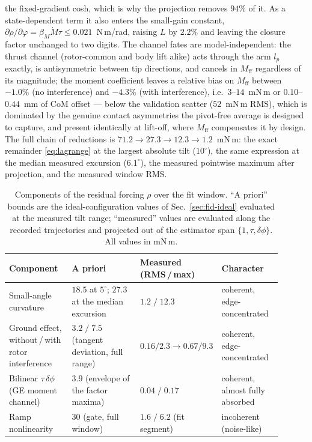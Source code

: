 the fixed-gradient cosh, which is why the projection removes $94\%$ of
it. As a state-dependent term it also enters the small-gain constant,
$\partial\rho/\partial\varphi = \beta_M\dot M\tau \le
0.021$~N\,m/rad, raising $L$ by $2.2\%$ and leaving the closure factor
unchanged to two digits. The channel fates are model-independent: the thrust channel
(rotor-common and body lift alike) acts through the arm $l_p$ exactly,
is antisymmetric between tip directions, and cancels in
$M_{\mathrm{ff}}$ regardless of its magnitude; the moment coefficient
leaves a relative bias on $M_{\mathrm{ff}}$ between $-1.0\%$
(no interference) and $-4.3\%$ (with interference), i.e.\
$3$--$14$~mN\,m or $0.10$--$0.44$~mm of CoM offset —
below the validation scatter ($52$~mN\,m RMS), which is dominated by
the genuine contact asymmetries the pivot-free average is designed to
capture, and present identically at lift-off, where $M_{\mathrm{ff}}$
compensates it by design. The full chain of reductions is
$71.2 \to 27.3 \to 12.3 \to 1.2$~mN\,m: the exact remainder
\eqref{eq:lagrange} at the largest absolute tilt ($10^\circ$), the same
expression at the median measured excursion ($6.1^\circ$), the measured
pointwise maximum after projection, and the measured window RMS.

\begin{table}[t]
\centering
\caption{Components of the residual forcing $\rho$ over the fit window.
``A priori'' bounds are the ideal-configuration values of
Sec.~\ref{sec:fid-ideal} evaluated at the measured tilt range;
``measured'' values are evaluated along the recorded trajectories and
projected out of the estimator span $\{1,\tau,\delta\phi\}$. All
values in mN\,m.}
\label{tab:rho}
\small
\setlength{\tabcolsep}{4pt}
\renewcommand{\arraystretch}{1.15}
\begin{tabular}{@{}p{0.235\linewidth} p{0.255\linewidth}
                  p{0.185\linewidth} p{0.225\linewidth}@{}}
\hline
\raggedright Component & \raggedright A priori &
\raggedright Measured (RMS\,/\,max) & \raggedright
Character \tabularnewline
\hline
\raggedright Small-angle curvature &
\raggedright $18.5$ at $5^\circ$; $27.3$ at the median
excursion & \raggedright $1.2\;/\;12.3$ &
\raggedright coherent, edge-concentrated \tabularnewline
\raggedright Ground effect, without\,/\,with rotor interference &
\raggedright $3.2\;/\;7.5$ (tangent deviation, full range) &
\raggedright $0.16/2.3 \rightarrow 0.67/9.3$ &
\raggedright coherent, edge-concentrated \tabularnewline
\raggedright Bilinear $\tau\,\delta\phi$ (GE moment channel) &
\raggedright $3.9$ (envelope of the factor maxima) &
\raggedright $0.04\;/\;0.17$ &
\raggedright coherent, almost fully absorbed \tabularnewline
\raggedright Ramp nonlinearity &
\raggedright $30$ (gate, full window) &
\raggedright $1.6\;/\;6.2$ (fit segment) &
\raggedright incoherent (noise-like) \tabularnewline
\hline
\end{tabular}
\end{table}

